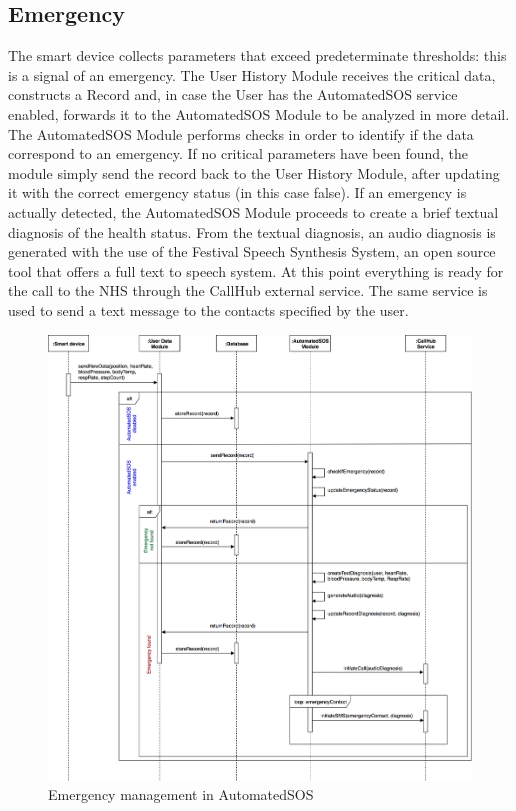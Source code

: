 \subsection{Emergency}

The smart device collects parameters that exceed predeterminate thresholds: this is a signal of an emergency.
The User History Module receives the critical data, constructs a Record and, in case the User has the AutomatedSOS service enabled, forwards it to the AutomatedSOS Module to be analyzed in more detail.
The AutomatedSOS Module performs checks in order to identify if the data correspond to an emergency. If no critical parameters have been found, the module simply send the record back to the User History Module, after updating it with the correct emergency status (in this case false). If an emergency is actually detected, the AutomatedSOS Module proceeds to create a brief textual diagnosis of the health status. From the textual diagnosis, an audio diagnosis is generated with the use of the Festival Speech Synthesis System, an open source tool that offers a full text to speech system. At this point everything is ready for the call to the NHS through the CallHub external service. The same service is used to send a text message to the contacts specified by the user.
\begin{figure}[H]

    \centering
    \includegraphics[scale=0.15]{./Pictures/sequence-emergency.png}
    \caption{Emergency management in AutomatedSOS}
    
\end{figure}

